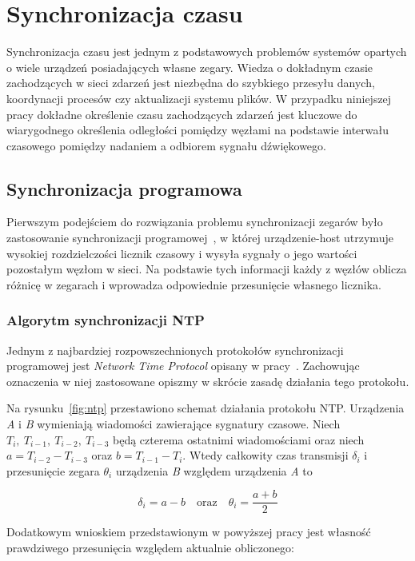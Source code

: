 \chapter{Synchronizacja czasu}\label{chap:time_sync}

Synchronizacja czasu jest jednym z podstawowych problemów systemów opartych o wiele urządzeń posiadających własne zegary. Wiedza o dokładnym czasie zachodzących w sieci zdarzeń jest niezbędna do szybkiego przesyłu danych, koordynacji procesów czy aktualizacji systemu plików. W przypadku niniejszej pracy dokładne określenie czasu zachodzących zdarzeń jest kluczowe do wiarygodnego określenia odległości pomiędzy węzłami na podstawie interwału czasowego pomiędzy nadaniem a odbiorem sygnału dźwiękowego.

\section{Synchronizacja programowa}

Pierwszym podejściem do rozwiązania problemu synchronizacji zegarów było zastosowanie synchronizacji programowej~\cite{6066334}, w której urządzenie-host utrzymuje wysokiej rozdzielczości licznik czasowy i wysyła sygnały o jego wartości pozostałym węzłom w sieci. Na podstawie tych informacji każdy z węzłów oblicza różnicę w zegarach i wprowadza odpowiednie przesunięcie własnego licznika.

\subsection{Algorytm synchronizacji NTP}\label{sec:ntp_sync}

Jednym z najbardziej rozpowszechnionych protokołów synchronizacji programowej jest \textit{Network Time Protocol} opisany w pracy~\cite{103043}. Zachowując oznaczenia w niej zastosowane opiszmy w skrócie zasadę działania tego protokołu.

Na rysunku~\ref{fig:ntp} przestawiono schemat działania protokołu NTP. Urządzenia \textit{A} i \textit{B} wymieniają wiadomości zawierające sygnatury czasowe. Niech $T_{i},\ T_{i-1},\ T_{i-2},\ T_{i-3}$ będą czterema ostatnimi wiadomościami oraz niech $a = T_{i-2} - T_{i-3}$ oraz $b = T_{i-1} - T_i$. Wtedy całkowity czas transmisji $\delta_i$ i przesunięcie zegara $\theta_i$ urządzenia \textit{B} względem urządzenia \textit{A} to

\[\delta_i = a - b\quad \text{oraz}\quad \theta_i = \frac{a+b}{2}\]

Dodatkowym wnioskiem przedstawionym w powyższej pracy jest własność prawdziwego przesunięcia względem aktualnie obliczonego:

